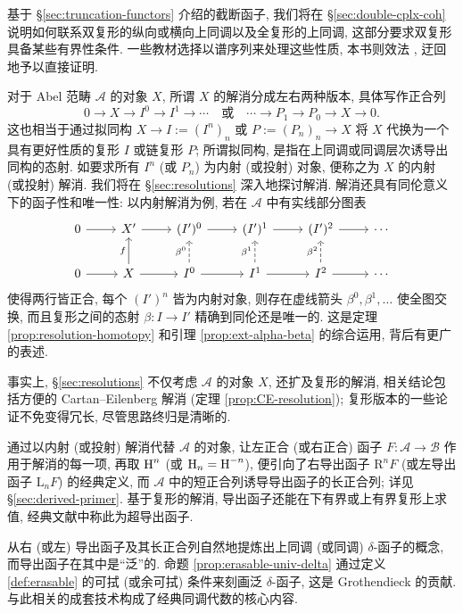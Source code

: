 基于 \S\ref{sec:truncation-functors} 介绍的截断函子, 我们将在 \S\ref{sec:double-cplx-coh} 说明如何联系双复形的纵向或横向上同调以及全复形的上同调, 这部分要求双复形具备某些有界性条件. 一些教材选择以谱序列来处理这些性质, 本书则效法 \cite{KS06}, 迂回地予以直接证明.

对于 Abel 范畴 $\mathcal{A}$ 的对象 $X$, 所谓 $X$ 的解消分成左右两种版本, 具体写作正合列
\[ 0 \to X \to I^0 \to I^1 \to \cdots \quad \text{或} \quad \cdots \to P_1 \to P_0 \to X \to 0. \]
这也相当于通过拟同构 $X \to I := (I^n)_n$ 或 $P := (P_n)_n \to X$ 将 $X$ 代换为一个具有更好性质的复形 $I$ 或链复形 $P$; 所谓拟同构, 是指在上同调或同调层次诱导出同构的态射. 如要求所有 $I^n$ (或 $P_n$) 为内射 (或投射) 对象, 便称之为 $X$ 的内射 (或投射) 解消. 我们将在 \S\ref{sec:resolutions} 深入地探讨解消. 解消还具有同伦意义下的函子性和唯一性: 以内射解消为例, 若在 $\mathcal{A}$ 中有实线部分图表
\[\begin{tikzcd}
	0 \arrow[r] & X' \arrow[r] & (I')^0 \arrow[r] & (I')^1 \arrow[r] & (I')^2 \arrow[r] & \cdots \\
	0 \arrow[r] & X \arrow[u, "f"] \arrow[r] & I^0 \arrow[dashed, u, "{\beta^0}"] \arrow[r] & I^1 \arrow[r] \arrow[dashed, u, "{\beta^1}"] & I^2 \arrow[r] \arrow[dashed, u, "{\beta^2}"] & \cdots 
\end{tikzcd}\]
使得两行皆正合, 每个 $(I')^n$ 皆为内射对象, 则存在虚线箭头 $\beta^0, \beta^1, \ldots$ 使全图交换, 而且复形之间的态射 $\beta: I \to I'$ 精确到同伦还是唯一的. 这是定理 \ref{prop:resolution-homotopy} 和引理 \ref{prop:ext-alpha-beta} 的综合运用, 背后有更广的表述.

事实上, \S\ref{sec:resolutions} 不仅考虑 $\mathcal{A}$ 的对象 $X$, 还扩及复形的解消, 相关结论包括方便的 Cartan--Eilenberg 解消 (定理 \ref{prop:CE-resolution}); 复形版本的一些论证不免变得冗长, 尽管思路终归是清晰的.

通过以内射 (或投射) 解消代替 $\mathcal{A}$ 的对象, 让左正合 (或右正合) 函子 $F: \mathcal{A} \to \mathcal{B}$ 作用于解消的每一项, 再取 $\operatorname{H}^n$ (或 $\operatorname{H}_n = \operatorname{H}^{-n}$), 便引向了右导出函子 $\mathrm{R}^n F$ (或左导出函子 $\mathrm{L}_n F$) 的经典定义, 而 $\mathcal{A}$ 中的短正合列诱导导出函子的长正合列; 详见 \S\ref{sec:derived-primer}. 基于复形的解消, 导出函子还能在下有界或上有界复形上求值, 经典文献中称此为超导出函子.

从右 (或左) 导出函子及其长正合列自然地提炼出上同调 (或同调) $\delta$-函子的概念, 而导出函子在其中是``泛''的. 命题 \ref{prop:erasable-univ-delta} 通过定义 \ref{def:erasable} 的可拭 (或余可拭) 条件来刻画泛 $\delta$-函子, 这是 Grothendieck 的贡献. 与此相关的成套技术构成了经典同调代数的核心内容.

